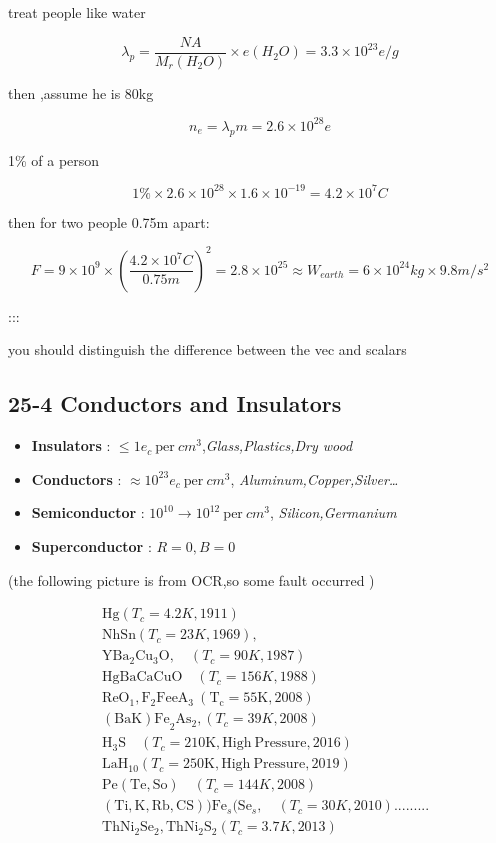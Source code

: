 \documentclass[
]{article}
\providecommand{\tightlist}{%
  \setlength{\itemsep}{0pt}\setlength{\parskip}{0pt}}
\begin{document}
treat people like water

\[
\lambda_p=\frac{NA}{M_r(H_2O)}\times e(H_2O)=3.3\times 10^{23}e/g
\]

then ,assume he is 80kg

\[
n_e=\lambda _p m=2.6\times 10^{28}e
\]

1\% of a person

\[
1\%\times 2.6\times 10^{28}\times 1.6\times 10^{-19}=4.2\times 10^7C
\]

then for two people 0.75m apart:

\[
F=9\times 10^{9}\times \left(\frac{4.2\times 10^7C}{0.75m}\right)^2=2.8\times 10^{25}\approx W_{earth}=6\times 10^{24}kg\times 9.8m/s^2
\]

:::

you should distinguish the difference between the vec and scalars

\hypertarget{conductors-and-insulators}{%
\subsection{25-4 Conductors and
Insulators}\label{conductors-and-insulators}}

\begin{itemize}
\tightlist
\item
  \textbf{Insulators} :
  \(\leqslant 1 e_c ~\mathrm{per}~ cm^3\),\emph{Glass,Plastics,Dry wood}
\item
  \textbf{Conductors} : \(\approx 10^{23} e_c ~\mathrm{per}~ cm^3\),
  \emph{Aluminum,Copper,Silver\ldots{}}
\item
  \textbf{Semiconductor} : \(10^{10}\to 10^{12} ~\mathrm{per}~ cm^3\),
  \emph{Silicon,Germanium}
\item
  \textbf{Superconductor} : \(R=0,B=0\)
\end{itemize}

(the following picture is from OCR,so some fault occurred )

\[
\begin{aligned}&\mathrm{Hg}\left(T_{c}{=}4.2K,1911\right)\\&\mathrm{NhSn}\left(T_{c}{=}23K,1969\right),\\&\mathrm{YBa}_{2}\mathrm{Cu}_{3}\mathrm{O},\quad(T_{c}{=}90K,1987)\\&\mathrm{HgBaCaCuO}\quad(T_{c}{=}156K,1988)\\&\mathrm{ReO}_{1},\mathrm{F}_{2}\mathrm{FeeA}_{3}\mathrm{~(T_{c}{=}55K,2008)}\\&\mathrm{(BaK)Fe}_{2}\mathrm{As}_{2},(T_{c}{=}39K,2008)\\&\mathrm{H}_{3}\mathrm{S}\quad(T_{c}{=}210\mathrm{K},\mathrm{High~Pressure},2016)\\&\mathrm{LaH}_{10}(T_{c}{=}250\mathrm{K},\mathrm{High~Pressure},2019)\\&\mathrm{Pe}(\mathrm{Te},\mathrm{So})\quad(T_{c}{=}144K,2008)\\&(\mathrm{Ti},\mathrm{K},\mathrm{Rb},\mathrm{CS}))\mathrm{Fe}_{s}(\mathrm{Se}_{s},\quad(T_{c}{=}30K,2010).........\\&\mathrm{ThNi}_{2}\mathrm{Se}_{2},\mathrm{ThNi}_{2}\mathrm{S}_{2}(T_{c}{=}3.7K,2013)\end{aligned}
\]
\end{document}
